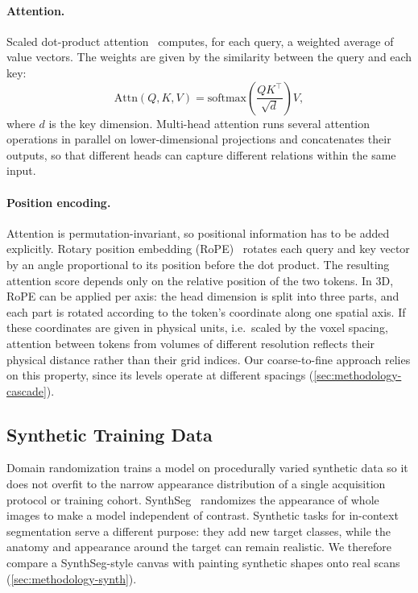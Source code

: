 \documentclass[hidelinks, a4paper, 12pt, ngerman, english]{article}  %
\begin{document}
\paragraph{Attention.}
Scaled dot-product attention~\cite{vaswani2017attention} computes, for each
query, a weighted average of value vectors. The weights are given by the
similarity between the query and each key:
%
\begin{equation}
  \mathrm{Attn}(Q,K,V) = \mathrm{softmax}\!\left(\frac{QK^\top}{\sqrt{d}}\right)V,
  \label{eq:attention}
\end{equation}
%
where $d$ is the key dimension. Multi-head attention runs several attention
operations in parallel on lower-dimensional projections and concatenates their
outputs, so that different heads can capture different relations within the
same input.

\paragraph{Position encoding.}
Attention is permutation-invariant, so positional information has to be added
explicitly. Rotary position embedding (RoPE)~\cite{su2021roformer} rotates each
query and key vector by an angle proportional to its position before the dot
product. The resulting attention score depends only on the relative position
of the two tokens. In 3D, RoPE can be applied per axis: the head dimension is
split into three parts, and each part is rotated according to the token's
coordinate along one spatial axis. If these coordinates are given in physical
units, i.e.\ scaled by the voxel spacing, attention between tokens from volumes
of different resolution reflects their physical distance rather than their grid
indices. Our coarse-to-fine approach relies on this property, since its levels operate at different spacings (\autoref{sec:methodology-cascade}).%
\subsection{Synthetic Training Data}\label{sec:fundamentals-synthdata}

Domain randomization trains a model on procedurally varied synthetic data
so it does not overfit to the narrow appearance distribution of a single
acquisition protocol or training cohort. SynthSeg~\cite{billot2023synthseg} randomizes the appearance of whole images to make a model independent
of contrast. Synthetic tasks for in-context segmentation serve a different
purpose: they add new target classes, while the anatomy and appearance around
the target can remain realistic. We therefore compare a SynthSeg-style canvas
with painting synthetic shapes onto real scans (\autoref{sec:methodology-synth}).%
\end{document}

